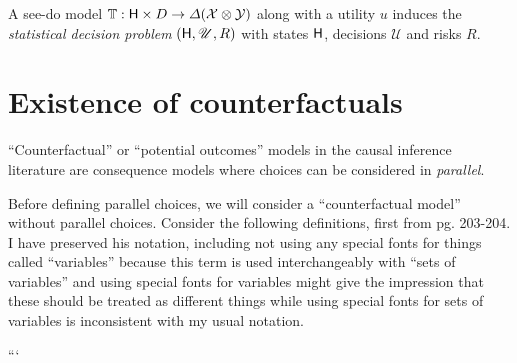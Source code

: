 \begin{definition}
A see-do model $\mathbb{T}:\mathsf{H}\times D\to \Delta(\mathcal{X}\otimes\mathcal{Y})$ along with a utility $u$ induces the \emph{statistical decision problem} $(\mathsf{H},\mathscr{U},R)$ with states $\mathsf{H}$, decisions $\mathscr{U}$ and risks $R$.


\end{definition}


\section{Existence of counterfactuals}


``Counterfactual'' or ``potential outcomes'' models in the causal inference literature are consequence models where choices can be considered in \emph{parallel}. 

Before defining parallel choices, we will consider a ``counterfactual model'' without parallel choices. Consider the following definitions, first from \citet{pearl_causality:_2009} pg. 203-204. I have preserved his notation, including not using any special fonts for things called ``variables'' because this term is used interchangeably with ``sets of variables'' and using special fonts for variables might give the impression that these should be treated as different things while using special fonts for sets of variables is inconsistent with my usual notation.


\vspace{1cm}

```
